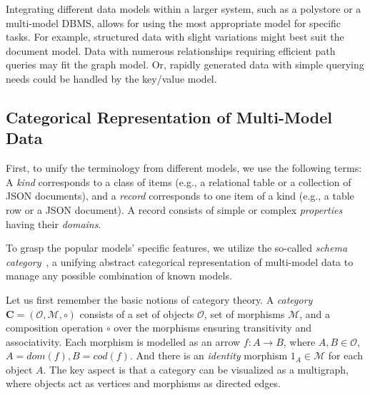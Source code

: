 Integrating different data models within a larger system, such as a polystore or a multi-model DBMS, allows for using the most appropriate model for specific tasks. For example, structured data with slight variations might best suit the document model. Data with numerous relationships requiring efficient path queries may fit the graph model. Or, rapidly generated data with simple querying needs could be handled by the key/value model.



\subsection{Categorical Representation of Multi-Model Data}

First, to unify the terminology from different models, we use the following terms: A \textit{kind} corresponds to a class of items (e.g., a relational table or a collection of JSON documents), and a \textit{record} corresponds to one item of a kind (e.g., a table row or a JSON document). A record consists of simple or complex \textit{properties} having their \textit{domains}.

To grasp the popular models' specific features, we utilize the so-called \textit{schema category}~\citep{mm_cat_journal}, a unifying abstract categorical representation of multi-model data to manage any possible combination of known models.

Let us first remember the basic notions of category theory.
A \textit{category} $\mathbf{C} = (\mathcal{O}, \mathcal{M}, \circ)$ consists of a set of objects $\mathcal{O}$, set of morphisms $\mathcal{M}$, and a composition operation $\circ$ over the morphisms ensuring transitivity and associativity. Each morphism is modelled as an arrow $f : A \rightarrow B$, where $A, B \in \mathcal{O}$, $A = dom(f), B = cod(f)$. And there is an \textit{identity} morphism $1_A \in \mathcal{M}$ for each object $A$.
The key aspect is that a category can be visualized as a multigraph, where objects act as vertices and morphisms as directed edges.

